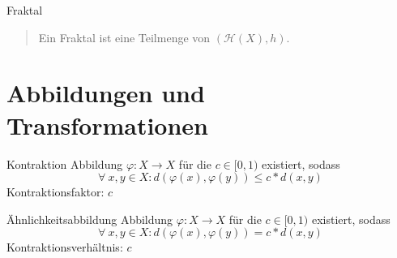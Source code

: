 \documentclass[10pt]{beamer}
\let\phi\varphi
\begin{document}
\begin{frame}{Fraktal}
  \begin{quote}
    Ein Fraktal ist eine Teilmenge von \( (\mathcal{H}(X), h) \).
  \end{quote}
\end{frame}

\section{Abbildungen und Transformationen}

\begin{frame}{Kontraktion}
  Abbildung \( \phi: X \to X \) für die \( c \in [0,1) \) existiert, sodass
  \begin{equation*}
    \forall \ x,y \in X : d(\phi(x), \phi(y)) \leq c * d(x,y)
  \end{equation*}
  \alert{Kontraktionsfaktor}: \( c \)
\end{frame}

\begin{frame}{Ähnlichkeitsabbildung}
  Abbildung \( \phi: X \to X \) für die \( c \in [0,1) \) existiert, sodass
  \begin{equation*}
    \forall \ x,y \in X : d(\phi(x), \phi(y)) = c * d(x,y)
  \end{equation*}
  \alert{Kontraktionsverhältnis}: \( c \)
\end{frame}
\end{document}
